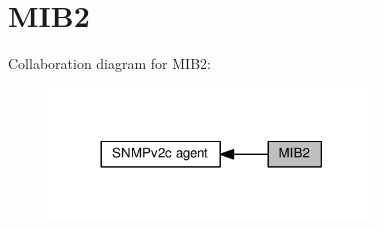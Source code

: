 \hypertarget{group__snmp__mib2}{}\section{M\+I\+B2}
\label{group__snmp__mib2}
Collaboration diagram for M\+I\+B2\+:
\nopagebreak
\begin{figure}[H]
\begin{center}
\leavevmode
\includegraphics[width=245pt]{group__snmp__mib2}
\end{center}
\end{figure}
